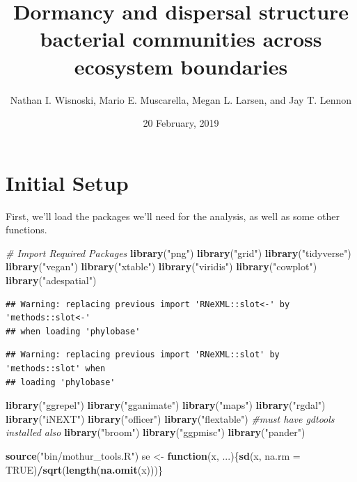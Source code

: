 \documentclass[]{article}
\title{Dormancy and dispersal structure bacterial communities across ecosystem
boundaries}
\author{Nathan I. Wisnoski, Mario E. Muscarella, Megan L. Larsen, and Jay T.
Lennon}
\date{20 February, 2019}
\newenvironment{Shaded}{\begin{snugshade}}{\end{snugshade}}
\newcommand{\KeywordTok}[1]{\textcolor[rgb]{0.13,0.29,0.53}{\textbf{#1}}}
\newcommand{\DataTypeTok}[1]{\textcolor[rgb]{0.13,0.29,0.53}{#1}}
\newcommand{\StringTok}[1]{\textcolor[rgb]{0.31,0.60,0.02}{#1}}
\newcommand{\CommentTok}[1]{\textcolor[rgb]{0.56,0.35,0.01}{\textit{#1}}}
\newcommand{\OtherTok}[1]{\textcolor[rgb]{0.56,0.35,0.01}{#1}}
\newcommand{\ControlFlowTok}[1]{\textcolor[rgb]{0.13,0.29,0.53}{\textbf{#1}}}
\newcommand{\OperatorTok}[1]{\textcolor[rgb]{0.81,0.36,0.00}{\textbf{#1}}}
\newcommand{\NormalTok}[1]{#1}
\begin{document}
\maketitle

\section{Initial Setup}\label{initial-setup}

First, we'll load the packages we'll need for the analysis, as well as
some other functions.

\begin{Shaded}
\begin{Highlighting}[]
\CommentTok{# Import Required Packages}
\KeywordTok{library}\NormalTok{(}\StringTok{"png"}\NormalTok{)}
\KeywordTok{library}\NormalTok{(}\StringTok{"grid"}\NormalTok{)}
\KeywordTok{library}\NormalTok{(}\StringTok{"tidyverse"}\NormalTok{)   }
\KeywordTok{library}\NormalTok{(}\StringTok{"vegan"}\NormalTok{)}
\KeywordTok{library}\NormalTok{(}\StringTok{"xtable"}\NormalTok{)}
\KeywordTok{library}\NormalTok{(}\StringTok{"viridis"}\NormalTok{)}
\KeywordTok{library}\NormalTok{(}\StringTok{"cowplot"}\NormalTok{)}
\KeywordTok{library}\NormalTok{(}\StringTok{"adespatial"}\NormalTok{)}
\end{Highlighting}
\end{Shaded}

\begin{verbatim}
## Warning: replacing previous import 'RNeXML::slot<-' by 'methods::slot<-'
## when loading 'phylobase'
\end{verbatim}

\begin{verbatim}
## Warning: replacing previous import 'RNeXML::slot' by 'methods::slot' when
## loading 'phylobase'
\end{verbatim}

\begin{Shaded}
\begin{Highlighting}[]
\KeywordTok{library}\NormalTok{(}\StringTok{"ggrepel"}\NormalTok{)}
\KeywordTok{library}\NormalTok{(}\StringTok{"gganimate"}\NormalTok{)}
\KeywordTok{library}\NormalTok{(}\StringTok{"maps"}\NormalTok{)}
\KeywordTok{library}\NormalTok{(}\StringTok{"rgdal"}\NormalTok{)}
\KeywordTok{library}\NormalTok{(}\StringTok{"iNEXT"}\NormalTok{)}
\KeywordTok{library}\NormalTok{(}\StringTok{"officer"}\NormalTok{)}
\KeywordTok{library}\NormalTok{(}\StringTok{"flextable"}\NormalTok{) }\CommentTok{#must have gdtools installed also}
\KeywordTok{library}\NormalTok{(}\StringTok{"broom"}\NormalTok{)}
\KeywordTok{library}\NormalTok{(}\StringTok{"ggpmisc"}\NormalTok{)}
\KeywordTok{library}\NormalTok{(}\StringTok{"pander"}\NormalTok{)}

\KeywordTok{source}\NormalTok{(}\StringTok{"bin/mothur_tools.R"}\NormalTok{)}
\NormalTok{se <-}\StringTok{ }\ControlFlowTok{function}\NormalTok{(x, ...)\{}\KeywordTok{sd}\NormalTok{(x, }\DataTypeTok{na.rm =} \OtherTok{TRUE}\NormalTok{)}\OperatorTok{/}\KeywordTok{sqrt}\NormalTok{(}\KeywordTok{length}\NormalTok{(}\KeywordTok{na.omit}\NormalTok{(x)))\}}
\end{Highlighting}
\end{Shaded}
\end{document}
